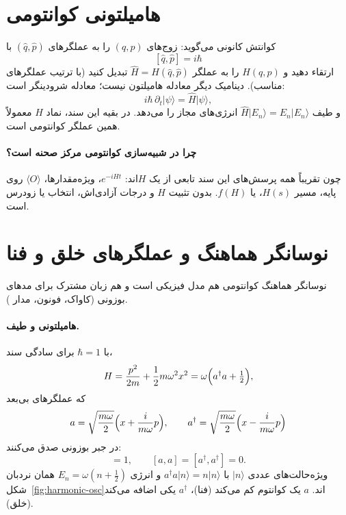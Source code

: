 \section{هامیلتونی کوانتومی}
\label{sec:quantum-H}

کوانتش کانونی می‌گوید: زوج‌های $(q,p)$ را به عملگرهای $(\hat q,\hat p)$ با
\begin{equation}
	\label{eq:ccr}
	[\hat q,\hat p]=i\hbar
\end{equation}
ارتقاء دهید و $H(q,p)$ را به عملگر $\hat H=H(\hat q,\hat p)$ تبدیل کنید (با ترتیب عملگرهای مناسب). دینامیک دیگر معادله هامیلتون نیست؛ معادله شرودینگر است:
\begin{equation}
	i\hbar\,\partial_t\lvert\psi\rangle = \hat H\lvert\psi\rangle,
\end{equation}
و طیف $\hat H\lvert E_n\rangle=E_n\lvert E_n\rangle$ انرژی‌های مجاز را می‌دهد. در بقیه این سند، نماد $H$ معمولاً همین عملگر کوانتومی است.

\paragraph{چرا در شبیه‌سازی کوانتومی مرکز صحنه است؟}
چون تقریباً همه پرسش‌های این سند تابعی از یک $H$اند: $e^{-iHt}$، ویژه‌مقدارها، $\langle O\rangle$ روی پایه، مسیر $H(s)$، یا $f(H)$. بدون تثبیت $H$ و درجات آزادی‌اش، انتخاب  یا  زودرس است.

\section{نوسانگر هماهنگ و عملگرهای خلق و فنا}
\label{sec:harmonic}

نوسانگر هماهنگ کوانتومی هم مدل فیزیکی است و هم زبان مشترک برای مدهای بوزونی (کاواک، فونون، مدار ).

\paragraph{هامیلتونی و طیف.}
با $\hbar=1$ برای سادگی سند،
\begin{equation}
	\label{eq:sho}
	H = \frac{p^2}{2m}+\frac12 m\omega^2 x^2
	= \omega\Bigl(a^\dagger a+\tfrac12\Bigr),
\end{equation}
که عملگرهای بی‌بعد
\begin{equation}
	a=\sqrt{\frac{m\omega}{2}}\Bigl(x+\frac{i}{m\omega}p\Bigr),
	\qquad
	a^\dagger=\sqrt{\frac{m\omega}{2}}\Bigl(x-\frac{i}{m\omega}p\Bigr)
\end{equation}
در جبر بوزونی صدق می‌کنند:
\begin{equation}
	[a,a^\dagger]=1,
	\qquad
	[a,a]=[a^\dagger,a^\dagger]=0.
\end{equation}
ویژه‌حالت‌های عددی $\lvert n\rangle$ با $a^\dagger a\lvert n\rangle=n\lvert n\rangle$ و انرژی $E_n=\omega(n+\tfrac12)$ همان نردبان شکل~\ref{fig:harmonic-osc}اند. $a$ یک کوانتوم کم می‌کند (فنا)، $a^\dagger$ یکی اضافه می‌کند (خلق).

